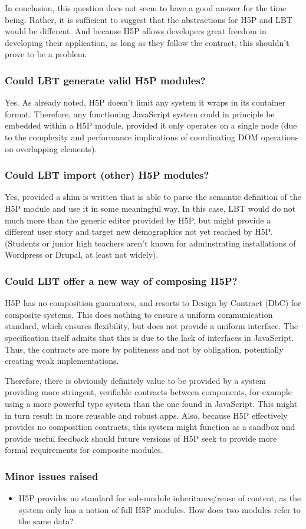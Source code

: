 In conclusion, this question does not seem to have a good answer for the time
being. Rather, it is sufficient to suggest that the abstractions for H5P and LBT
would be different. And because H5P allows developers great freedom in
developing their application, as long as they follow the contract, this
shouldn't prove to be a problem.

\subsubsection{Could LBT generate valid H5P modules?}

Yes. As already noted, H5P doesn't limit any system it wraps in its container
format. Therefore, any functioning JavaScript system could in principle be
embedded within a H5P module, provided it only operates on a single node (due to
the complexity and performance implications of coordinating DOM operations on
overlapping elements).

\subsubsection{Could LBT import (other) H5P modules?}

Yes, provided a shim is written that is able to parse the semantic definition of
the H5P module and use it in some meaningful way. In this case, LBT would do not
much more than the generic editor provided by H5P, but might provide a different
user story and target new demographics not yet reached by H5P. (Students or
junior high teachers aren't known for adminstrating installations of Wordpress
or Drupal, at least not widely).

\subsubsection{Could LBT offer a new way of composing H5P?}

H5P has no composition guarantees, and resorts to Design by Contract (DbC) for
composite systems.\cite{h5pdbc} This does nothing to ensure a uniform
communication standard, which ensures flexibility, but does not provide a
uniform interface. The specification itself admits that this is due to the lack
of interfaces in JavaScript. Thus, the contracts are more by politeness and not
by obligation, potentially creating weak implementations.

Therefore, there is obviously definitely value to be provided by a system
providing more stringent, verifiable contracts between components, for example
using a more powerful type system than the one found in JavaScript. This might
in turn result in more reusable and robust apps. Also, because H5P effectively
provides no composition contracts, this system might function as a sandbox and
provide useful feedback should future versions of H5P seek to provide more
formal requirements for composite modules.

\subsubsection{Minor issues raised}

\begin{itemize}
\item H5P provides no standard for sub-module inheritance/reuse of content, as the
system only has a notion of full H5P modules. How does two modules refer to
the same data?
\end{itemize}


